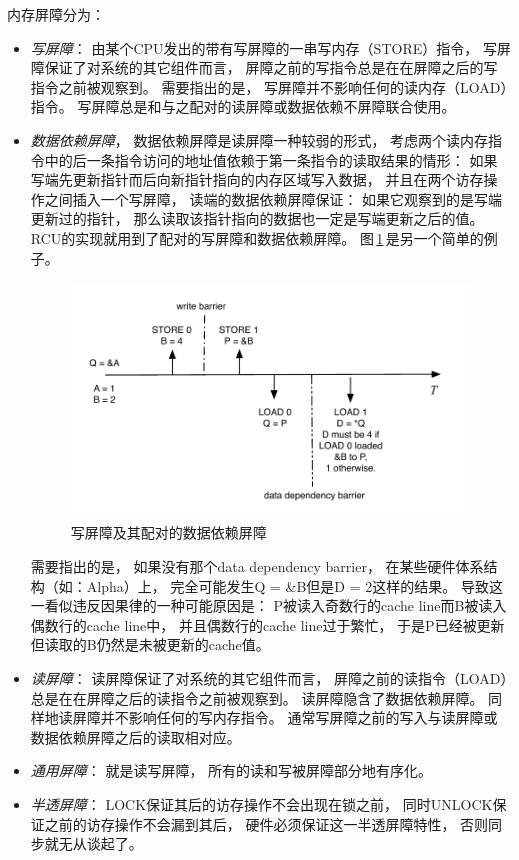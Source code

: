 \documentclass[11pt]{article}
\begin{document}
内存屏障分为：
\begin{itemize}
  \item {\em 写屏障}：
    由某个CPU发出的带有写屏障的一串写内存（STORE）指令，
    写屏障保证了对系统的其它组件而言，
    屏障之前的写指令总是在在屏障之后的写指令之前被观察到。
    需要指出的是，
    写屏障并不影响任何的读内存（LOAD）指令。
    写屏障总是和与之配对的读屏障或数据依赖不屏障联合使用。
  \item {\em 数据依赖屏障}，
    数据依赖屏障是读屏障一种较弱的形式，
    考虑两个读内存指令中的后一条指令访问的地址值依赖于第一条指令的读取结果的情形：
    如果写端先更新指针而后向新指针指向的内存区域写入数据，
    并且在两个访存操作之间插入一个写屏障，
    读端的数据依赖屏障保证：
    如果它观察到的是写端更新过的指针，
    那么读取该指针指向的数据也一定是写端更新之后的值。
    RCU的实现就用到了配对的写屏障和数据依赖屏障。
    图\,\ref{fig:ddmb}\,是另一个简单的例子。
    \begin{figure}[!ht]
      \centering
      \includegraphics[scale=0.75]{fig/wmb_ddmb}
      \caption{写屏障及其配对的数据依赖屏障}
      \label{fig:ddmb}
    \end{figure}
    需要指出的是，
    如果没有那个data dependency barrier，
    在某些硬件体系结构（如：Alpha）上，
    完全可能发生Q = \&B但是D = 2这样的结果。
    导致这一看似违反因果律的一种可能原因是：
    P被读入奇数行的cache line而B被读入偶数行的cache line中，
    并且偶数行的cache line过于繁忙，
    于是P已经被更新但读取的B仍然是未被更新的cache值。
  \item {\em 读屏障}：
    读屏障保证了对系统的其它组件而言，
    屏障之前的读指令（LOAD）总是在在屏障之后的读指令之前被观察到。
    读屏障隐含了数据依赖屏障。
    同样地读屏障并不影响任何的写内存指令。
    通常写屏障之前的写入与读屏障或数据依赖屏障之后的读取相对应。
  \item {\em 通用屏障}：
    就是读写屏障，
    所有的读和写被屏障部分地有序化。
  \item {\em 半透屏障}：
    LOCK保证其后的访存操作不会出现在锁之前，
    同时UNLOCK保证之前的访存操作不会漏到其后，
    硬件必须保证这一半透屏障特性，
    否则同步就无从谈起了。
\end{itemize}
\end{document}
